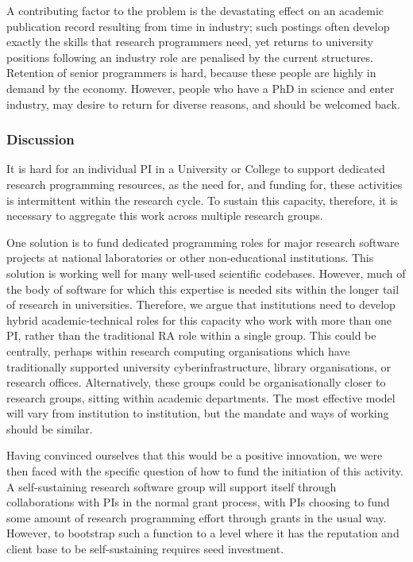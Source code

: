 A contributing factor to the problem is the devastating effect on an academic
publication record resulting from time in industry; such postings often
develop exactly the skills that research programmers need, yet returns to
university positions following an industry role are penalised by the current
structures. Retention of senior programmers is hard, because these people
are highly in demand by the economy. However,
people who have a PhD in science and enter industry,
may desire to return for diverse reasons, and should be welcomed back.

\subsubsection{Discussion}

It is hard for an individual PI in a University or College
to support dedicated research programming
resources, as the need for, and funding for, these activities is intermittent
within the research cycle. To sustain this capacity, therefore, it is
necessary to aggregate this work across multiple research groups.

One solution is to fund dedicated programming roles for major research software
projects at national laboratories or other non-educational institutions. This
solution is working well for many well-used scientific codebases.
However, much of the body of software for which this expertise is needed sits
within the longer tail of research in universities. Therefore, we argue that
institutions need to develop hybrid academic-technical roles for this capacity
who work with more than one PI, rather than the traditional RA role within a
single group. This could be centrally, perhaps within research computing
organisations which have traditionally supported university cyberinfrastructure,
library organisations, or research offices. Alternatively, these groups could
be organisationally closer to research groups, sitting within academic
departments. The most
effective model will vary from institution to institution,
but the mandate and ways of working should be similar.

Having convinced ourselves that this would be a positive innovation, we were
then faced with the specific question of how to fund the initiation of this
activity. A self-sustaining research software group will support itself
through collaborations with PIs in the normal grant process, with PIs choosing
to fund some amount of research programming effort through grants in the usual
way. However, to bootstrap such a function to a level where it has the
reputation and client base to be self-sustaining requires seed investment.

